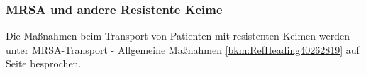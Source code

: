 

\subsubsection{MRSA und andere Resistente Keime}

Die Ma{\ss}nahmen beim Transport von Patienten mit resistenten Keimen
werden unter {\quotedblbase}MRSA-Transport - Allgemeine
Ma{\ss}nahmen{\quotedblbase} 
\ref{bkm:RefHeading40262819} auf
Seite \pageref{bkm:RefHeading40262819} besprochen.
